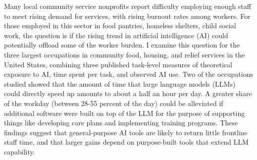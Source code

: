 Many local community service nonprofits report difficulty employing enough staff to meet rising demand for services, with rising burnout rates among workers. For those employed in this sector in food pantries, homeless shelters, child social work, the question is if the rising trend in artificial intelligence (AI) could potentially offload some of the worker burden. I examine this question for the three largest occupations in community food, housing, and relief services in the United States, combining three published task-level measures of theoretical exposure to AI, time spent per task, and observed AI use. Two of the occupations studied showed that the amount of time that large language models (LLMs) could directly speed up amounts to about a half an hour per day. A greater share of the workday (between 28-55 percent of the day) could be alleviated if additional software were built on top of the LLM for the purpose of supporting things like developing care plans and implementing training programs. These findings suggest that general-purpose AI tools are likely to return little frontline staff time, and that larger gains depend on purpose-built tools that extend LLM capability.
